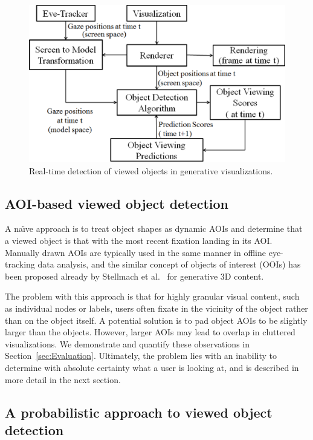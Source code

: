 \begin{figure}[htb]
  \centering
  \includegraphics[width=0.99\linewidth]{images/systemBlockDiagram.eps}
  \caption{Real-time detection of viewed objects in generative visualizations.}
	\label{fig:systemBlockDiagram}
\end{figure}

\subsection{AOI-based viewed object detection}
\label{sec:AOIBasedViewedObjectDetection}

A na\"{\i}ve approach is to treat object shapes as dynamic AOIs and determine that a viewed object is that with the most recent fixation landing in its AOI. Manually drawn AOIs are typically used in the same manner in offline eye-tracking data analysis, and the similar concept of objects of interest (OOIs) has been proposed already by Stellmach et al.~\cite{stellmach20103d} for generative 3D content.

The problem with this approach is that for highly granular visual content, such as individual nodes or labels, users often fixate in the vicinity of the object rather than on the object itself. A potential solution is to pad object AOIs to be slightly larger than the objects. However, larger AOIs may lead to overlap in cluttered visualizations. We demonstrate and quantify these observations in Section~\ref{sec:Evaluation}. Ultimately, the problem lies with an inability to determine with absolute certainty what a user is looking at, and is described in more detail in the next section.

\subsection{A probabilistic approach to viewed object detection}
\label{sec:ProbabilisticObjectDetection}

